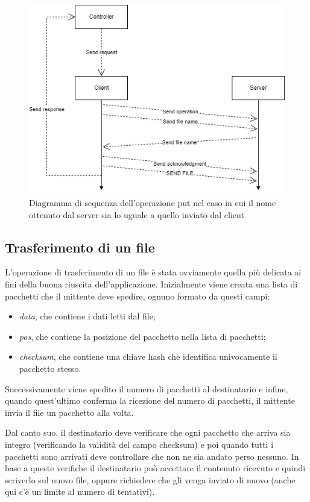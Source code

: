 \documentclass[a4paper,12pt]{report}
\begin{document}
\begin{figure}[H]
    \centering
    \includegraphics[scale=0.55]{img/put.jpg}
    \caption{Diagramma di sequenza dell'operazione put nel caso in cui il nome ottenuto dal server sia lo uguale a quello inviato dal client}
\end{figure}

\subsection{Trasferimento di un file}
L'operazione di trasferimento di un file è stata ovviamente quella più delicata ai fini della buona riuscita dell'applicazione.
Inizialmente viene creata una lista di pacchetti che il mittente deve spedire, ognuno formato da questi campi: 
\begin{itemize}
    \item \textit{data}, che contiene i dati letti dal file;
    \item \textit{pos}, che contiene la posizione del pacchetto nella lista di pacchetti;
    \item \textit{checksum}, che contiene una chiave hash che identifica univocamente il pacchetto stesso.
\end{itemize}
Successivamente viene spedito il numero di pacchetti al destinatario e infine, quando quest'ultimo conferma la ricezione del numero di pacchetti, il mittente invia il file un pacchetto alla volta.

Dal canto suo, il destinatario deve verificare che ogni pacchetto che arriva sia integro (verificando la validità del campo checksum) e poi quando tutti i pacchetti sono arrivati deve controllare che non ne sia andato perso nessuno. In base a queste verifiche il destinatario può accettare il contenuto ricevuto e quindi scriverlo sul nuovo file, oppure richiedere che gli venga inviato di nuovo (anche qui c'è un limite al numero di tentativi).
\end{document}
